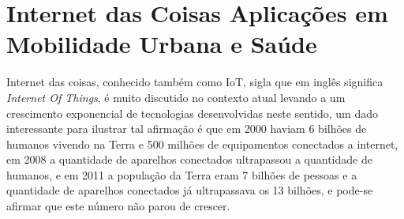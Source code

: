 \chapter{Internet das Coisas Aplicações em Mobilidade Urbana e Saúde}
\label{chap:cap1}

Internet das coisas, conhecido também como IoT, sigla que em inglês significa \textit{Internet Of Things}, é muito discutido no contexto atual levando a um crescimento exponencial de tecnologias desenvolvidas neste sentido, um dado interessante para ilustrar tal afirmação é que em 2000 haviam 6 bilhões de humanos vivendo na Terra e 500 milhões de equipamentos conectados a internet, em 2008 a quantidade de aparelhos conectados ultrapassou a quantidade de humanos, e em 2011 a população da Terra eram 7 bilhões de pessoas e a quantidade de aparelhos conectados já ultrapassava os 13 bilhões, e pode-se afirmar que este número não parou de crescer.






